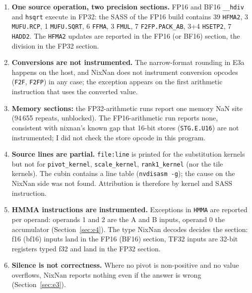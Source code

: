 \documentclass[11pt,a4paper]{article}
\begin{document}
\begin{enumerate}
  Consequences. In E3a with IEEE \texttt{sqrtf} the first report is this discarded \texttt{rsqrt(0)}; without it (\texttt{MUFU.SQRT}, and the FP16/BF16 \texttt{hsqrt} of E3b) the first report is \texttt{MUFU.RCP} in \texttt{scale\_kernel},
  the division by the zero pivot, which is \textbf{genuine} (its Inf or NaN reaches the output). For the square root of a \emph{negative} pivot (E4) the NaN at the sqrt is genuine in both builds. The remaining sqrt-site lines in the logs
  (NaN on operand 1 and 0 of the sqrt, \texttt{@P0 FADD.FTZ ... , 1}) are NaN \emph{inputs} propagated from earlier kernels, also genuine. Compare the \texttt{FFMA}-as-register-move artifact in the LU study:
  a SASS-level detector reports what the compiled code does, including speculative instructions.
  \item \textbf{One source operation, two precision sections.} FP16 and BF16 \texttt{\_\_hdiv} and \texttt{hsqrt} execute in FP32: the SASS of the FP16 build contains 39 \texttt{HFMA2}, 3 \texttt{MUFU.RCP},
  1 \texttt{MUFU.SQRT}, 6 \texttt{FFMA}, 3 \texttt{FMUL}, 7 \texttt{F2FP.PACK\_AB}, 3+4 \texttt{HSETP2}, 7 \texttt{HADD2}. The \texttt{HFMA2} updates are reported in the FP16 (or BF16) section, the division in the FP32 section.
  \item \textbf{Conversions are not instrumented.} The narrow-format rounding in E3a happens on the host, and NixNan does not instrument conversion opcodes (\texttt{F2F}, \texttt{F2FP}) in any case; the exception appears on the
  first arithmetic instruction that uses the converted value.
  \item \textbf{Memory sections:} the FP32-arithmetic runs report one memory NaN site (94\,655 repeats, unblocked). The FP16-arithmetic run reports none, consistent with nixnan's known gap that 16-bit stores (\texttt{STG.E.U16}) are not instrumented; I did not check the store opcode in this program.
  \item \textbf{Source lines are partial.} \texttt{file:line} is printed for the substitution kernels but not for \texttt{pivot\_kernel}, \texttt{scale\_kernel}, \texttt{rank1\_kernel} (nor the tile kernels). The cubin contains a line table (\texttt{nvdisasm -g}); the cause on the NixNan side was not found. Attribution is therefore by kernel and SASS instruction.
  \item \textbf{HMMA instructions are instrumented.} Exceptions in \texttt{HMMA} are reported per operand: operands 1 and 2 are the A and B inputs, operand 0 the accumulator (Section~\ref{sec:e4}). The type NixNan decodes decides the section: f16 (bf16) inputs land in the FP16 (BF16) section, TF32 inputs are 32-bit registers typed f32 and land in the FP32 section.
  \item \textbf{Silence is not correctness.} Where no pivot is non-positive and no value overflows, NixNan reports nothing even if the answer is wrong (Section~\ref{sec:e3}).
\end{enumerate}
\end{document}
